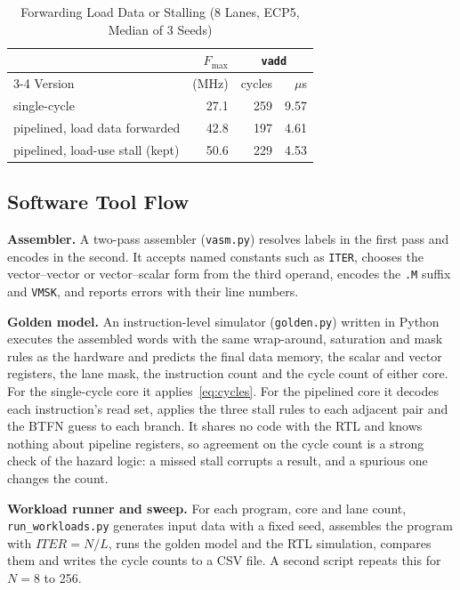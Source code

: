 \begin{table}[t]
\centering
\caption{Forwarding Load Data or Stalling (8 Lanes, ECP5, Median of 3 Seeds)}
\label{tab:fwd}
\footnotesize
\begin{tabular}{@{}lrrr@{}}
\toprule
 & $F_{\max}$ & \multicolumn{2}{c}{\texttt{vadd}} \\
\cmidrule(l){3-4}
Version & (MHz) & cycles & $\mu$s \\
\midrule
single-cycle & 27.1 & 259 & 9.57 \\
pipelined, load data forwarded & 42.8 & 197 & 4.61 \\
pipelined, load-use stall (kept) & 50.6 & 229 & 4.53 \\
\bottomrule
\end{tabular}
\end{table}

\subsection{Software Tool Flow}\label{sec:tools}
\textbf{Assembler.} A two-pass assembler (\texttt{vasm.py}) resolves labels in the
first pass and encodes in the second. It accepts named constants such as \texttt{ITER},
chooses the vector--vector or vector--scalar form from the third operand, encodes the
\texttt{.M} suffix and \texttt{VMSK}, and reports errors with their line numbers.

\textbf{Golden model.} An instruction-level simulator (\texttt{golden.py}) written in
Python executes the assembled words with the same wrap-around, saturation and mask rules
as the hardware and predicts the final data memory, the scalar and vector registers, the
lane mask, the instruction count and the cycle count of either core. For the
single-cycle core it applies~\eqref{eq:cycles}. For the pipelined core it decodes each
instruction's read set, applies the three stall rules to each adjacent pair and the BTFN
guess to each branch. It shares no code with the RTL and knows nothing about pipeline
registers, so agreement on the cycle count is a strong check of the hazard logic: a
missed stall corrupts a result, and a spurious one changes the count.

\textbf{Workload runner and sweep.} For each program, core and lane count,
\texttt{run\_workloads.py} generates input data with a fixed seed, assembles the program
with $\mathit{ITER} = N/L$, runs the golden model and the RTL simulation, compares them
and writes the cycle counts to a CSV file. A second script repeats this for
$N = 8$ to 256.

